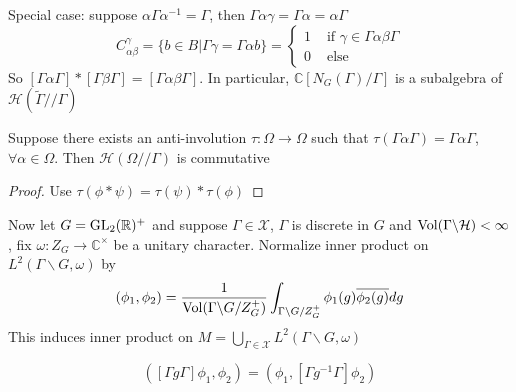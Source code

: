 \documentclass[main]{subfiles}
\begin{document}
Special case: suppose $\alpha\Gamma\alpha^{-1}=\Gamma$, then $\Gamma\alpha\gamma=\Gamma\alpha=\alpha\Gamma$
\[C^\gamma_{\alpha\beta}=\{b\in B|\Gamma\gamma=\Gamma\alpha b\}=\begin{cases}
1&\text{ if }\gamma\in\Gamma\alpha\beta\Gamma \\
0&\text{ else}
\end{cases}\]
So $[\Gamma\alpha\Gamma]*[\Gamma\beta\Gamma]=[\Gamma\alpha\beta\Gamma]$. In particular, $\mathbb C[N_G(\Gamma)/\Gamma]$ is a subalgebra of $\mathscr H(\tilde \Gamma//\Gamma)$

\begin{lemma}\label{Hecke operators, Lemma 1}
Suppose there exists an anti-involution $\tau:\Omega\to\Omega$ such that $\tau(\Gamma\alpha\Gamma)=\Gamma\alpha\Gamma$, $\forall \alpha\in\Omega$. Then $\mathscr H(\Omega//\Gamma)$ is commutative
\end{lemma}

\begin{proof}
Use $\tau(\phi*\psi)=\tau(\psi)*\tau(\phi)$
\end{proof}

Now let $G=\operatorname{GL}_2(\mathbb R)^+$ and suppose $\Gamma\in\mathscr X$, $\Gamma$ is discrete in $G$ and $\operatorname{Vol}(\Gamma\backslash\mathcal H)<\infty$, fix $\omega:Z_G\to\mathbb C^\times$ be a unitary character. Normalize inner product on $L^2(\Gamma\backslash G,\omega)$ by
\[(\phi_1,\phi_2)=\frac{1}{\operatorname{Vol}(\Gamma\backslash G/Z_G^+)}\int_{\Gamma\backslash G/Z_G^+}\phi_1(g)\overline{\phi_2(g)}dg\]
This induces inner product on $M=\bigcup_{\Gamma\in\mathscr X}L^2(\Gamma\backslash G,\omega)$

\begin{lemma}\label{Heck operators Lemma 2}
\[([\Gamma g\Gamma]\phi_1,\phi_2)=(\phi_1,[\Gamma g^{-1}\Gamma]\phi_2)\]
\end{lemma}
\end{document}
